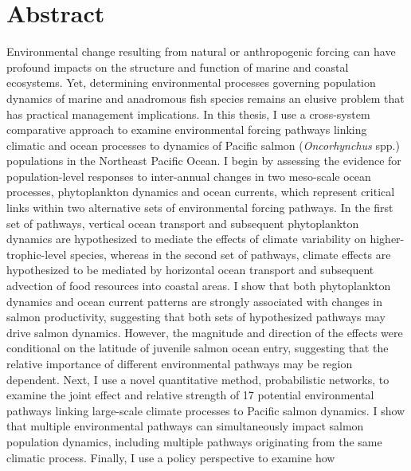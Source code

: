 %
%
%


\chapter*{Abstract}


Environmental change resulting from natural or anthropogenic forcing can have
profound impacts on the structure and function of marine and coastal ecosystems.
Yet, determining environmental processes governing population dynamics of marine
and anadromous fish species remains an elusive problem that has practical
management implications. In this thesis, I use a cross-system comparative
approach to examine environmental forcing pathways linking climatic and ocean
processes to dynamics of Pacific salmon (\textit{Oncorhynchus} spp.) populations
in the Northeast Pacific Ocean. I begin by assessing the evidence for
population-level responses to inter-annual changes in two meso-scale ocean
processes, phytoplankton dynamics and ocean currents, which represent critical
links within two alternative sets of environmental forcing pathways. In the
first set of pathways, vertical ocean transport and subsequent phytoplankton
dynamics are hypothesized to mediate the effects of climate variability on
higher-trophic-level species, whereas in the second set of pathways, climate
effects are hypothesized to be mediated by horizontal ocean transport and
subsequent advection of food resources into coastal areas. I show that both
phytoplankton dynamics and ocean current patterns are strongly associated with
changes in salmon productivity, suggesting that both sets of hypothesized
pathways may drive salmon dynamics. However, the magnitude and direction of the
effects were conditional on the latitude of juvenile salmon ocean entry,
suggesting that the relative importance of different environmental pathways may
be region dependent. Next, I use a novel quantitative method, probabilistic
networks, to examine the joint effect and relative strength of 17 potential
environmental pathways linking large-scale climate processes to Pacific salmon
dynamics. I show that multiple environmental pathways can simultaneously impact
salmon population dynamics, including multiple pathways originating from the
same climatic process. Finally, I use a policy perspective to examine how
